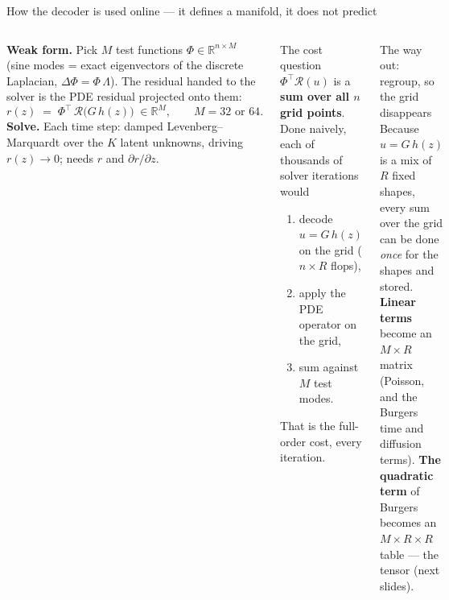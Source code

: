 \documentclass[10pt,aspectratio=169]{beamer}
\newcommand{\T}{^{\top}}
\newcommand{\R}{\mathbb{R}}
\begin{document}
\begin{frame}{How the decoder is used online --- it defines a manifold, it does not predict}
  \footnotesize
  \begin{columns}[T]
    \textbf{Weak form.} Pick $M$ test functions $\Phi\in\R^{n\times M}$ (sine modes = exact eigenvectors of the discrete Laplacian, $\Delta\Phi = \Phi\,\Lambda$). The residual handed to the solver is the PDE residual projected onto them:
    \[
      r(z) \;=\; \Phi\T\,\mathcal{R}\big(G\,h(z)\big)\;\in\R^{M},\qquad M = 32\text{ or }64 .
    \]
    \textbf{Solve.} Each time step: damped Levenberg--Marquardt over the $K$ latent unknowns, driving $r(z)\to0$; needs $r$ and $\partial r/\partial z$.
    \begin{block}{The cost question}
      $\Phi\T\mathcal{R}(u)$ is a \textbf{sum over all $n$ grid points}. Done naively, each of thousands of solver iterations would
      \begin{enumerate}
        \item decode $u=G\,h(z)$ on the grid ($n\times R$ flops),
        \item apply the PDE operator on the grid,
        \item sum against $M$ test modes.
      \end{enumerate}
      That is the full-order cost, every iteration.
    \end{block}
    \begin{block}{The way out: regroup, so the grid disappears}
      Because $u = G\,h(z)$ is a mix of $R$ fixed shapes, every sum over the grid can be done \emph{once} for the shapes and stored.
      \textbf{Linear terms} become an $M\times R$ matrix (Poisson, and the Burgers time and diffusion terms).
      \textbf{The quadratic term} of Burgers becomes an $M\times R\times R$ table --- the tensor (next slides).
    \end{block}
  \end{columns}
\end{frame}
\end{document}
